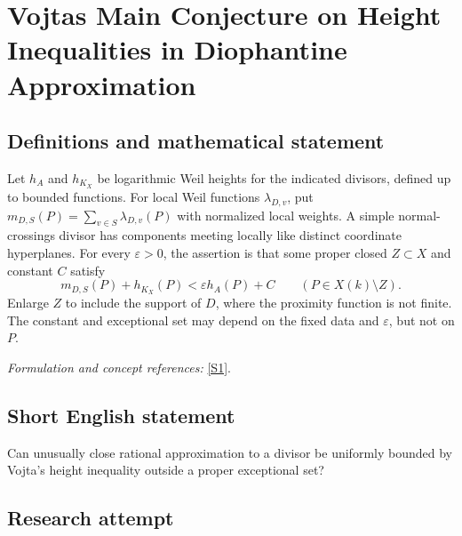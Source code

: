 \documentclass[11pt,a4paper]{article}
\newcommand{\sref}[2]{\hyperlink{source:#1:#2}{[S#2]}}
\newif\ifshowcatalogue
\newcommand{\cataloguescope}[1]{\ifshowcatalogue
 \paragraph{Exact scope in the supplied catalogue.}
 \begin{quote}\small #1\end{quote}\fi}
\numberwithin{equation}{section}
\begin{document}
\setcounter{section}{63}
\clearpage
\section{\texorpdfstring{Vojtas Main Conjecture on Height Inequalities in Diophantine Approximation}{Vojtas Main Conjecture on Height Inequalities in Diophantine Approximation}}\label{64}
\subsection{Definitions and mathematical statement}
Let $h_A$ and $h_{K_X}$ be logarithmic Weil heights for the indicated divisors, defined up to bounded functions. For local Weil functions $\lambda_{D,v}$, put $m_{D,S}(P)=\sum_{v\in S}\lambda_{D,v}(P)$ with normalized local weights. A simple normal-crossings divisor has components meeting locally like distinct coordinate hyperplanes. For every $\varepsilon>0$, the assertion is that some proper closed $Z\subset X$ and constant $C$ satisfy
\[
 m_{D,S}(P)+h_{K_X}(P)<\varepsilon h_A(P)+C
 \qquad(P\in X(k)\setminus Z).
\]
Enlarge $Z$ to include the support of $D$, where the proximity function is not finite. The constant and exceptional set may depend on the fixed data and $\varepsilon$, but not on $P$.
\par\smallskip\textit{Formulation and concept references:} \sref{64}{1}.
\cataloguescope{Let k be a number field, X a smooth projective variety over k, K\_X a canonical divisor, A an ample divisor, D an effective simple normal-crossings divisor, and S a finite set of places containing the archimedean places. Prove that for every epsilon > 0 there are a proper Zariski-closed subset Z of X and a constant C such that m\_\{D,S\}(P)+h\_\{K\_X\}(P) < epsilon h\_A(P)+C for every P in X(k) outside Z.}
\subsection{Short English statement}
Can unusually close rational approximation to a divisor be uniformly bounded by Vojta's height inequality outside a proper exceptional set?
\subsection{Research attempt}
\end{document}
